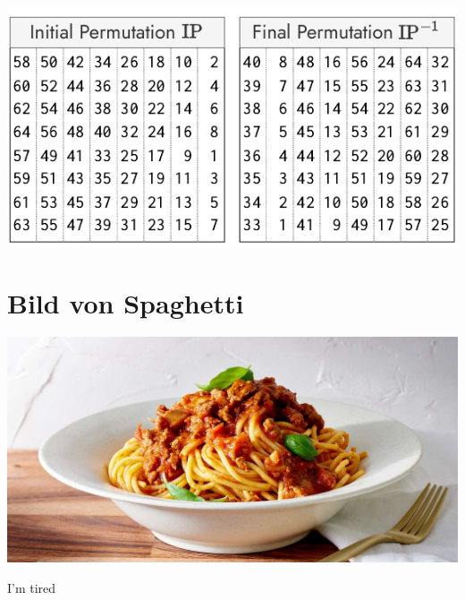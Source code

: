 \documentclass[
  10pt,
  a4paper,
]{article}
\begin{document}
\begin{multicols*}{2}
\begin{center}
\includegraphics{images/crypto/permutation tables.pdf}
\end{center}

\section{Bild von Spaghetti}\label{bild-von-spaghetti}

\includegraphics{images/s6_advanced_system_design/Easyspaghettiwithtomatosauce_11715_DDMFS_1x2_2425-c67720e4ea884f22a852f0bb84a87a80.jpg}

\footnotesize I'm tired

\end{multicols*}
\end{document}
